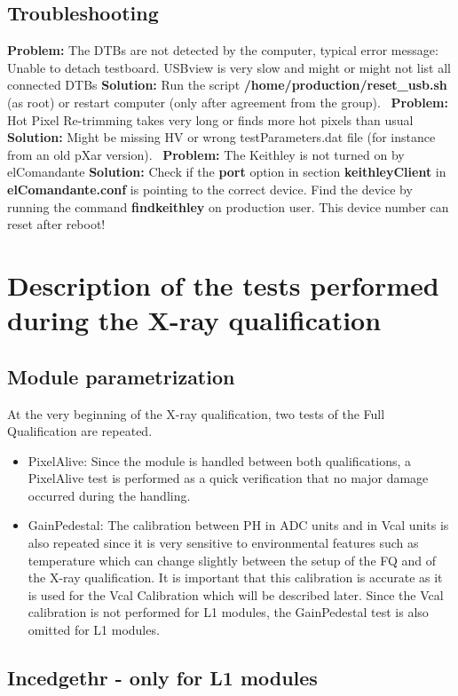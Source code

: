 \documentclass[a4paper,12pt,twoside]{article}
\newcommand{\prob}[1]{{\textbf{Problem: } #1}\newline}
\newcommand{\sol}[1]{{\textbf{Solution: } #1 \newline \,\newline}}
\begin{document}
\subsection{Troubleshooting}

\prob{The DTBs are not detected by the computer, typical error message: Unable to detach testboard. USBview is very slow and might or might not list all connected DTBs}
\sol{Run the script \textbf{/home/production/reset\_usb.sh} (as root) or restart computer (only after agreement from the group).}
\prob{Hot Pixel Re-trimming takes very long or finds more hot pixels than usual}
\sol{Might be missing HV or wrong testParameters.dat file (for instance from an old pXar version).}
\prob{The Keithley is not turned on by elComandante}
\sol{Check if the \textbf{port} option in section \textbf{keithleyClient} in \textbf{elComandante.conf} is pointing to the correct device. Find the device by running the command \mbox{\textbf{findkeithley}} on production user. This device number can reset after reboot!}

\section{Description of the tests performed during the X-ray qualification}
\subsection{Module parametrization}
At the very beginning of the X-ray qualification, two tests of the Full Qualification are repeated. 
\begin{itemize}
\item PixelAlive: Since the module is handled between both qualifications, a PixelAlive test is performed as a quick verification that no major damage occurred during the handling.
\item GainPedestal: The calibration between PH in ADC units and in Vcal units is also repeated since it is very sensitive to environmental features such as temperature which can change slightly between the setup of the FQ and of the X-ray qualification. It is important that this calibration is accurate as it is used for the Vcal Calibration which will be described later. Since the Vcal calibration is not performed for L1 modules, the GainPedestal test is also omitted for L1 modules.
\end{itemize}
\subsection{Incedgethr - only for L1 modules}
\end{document}
